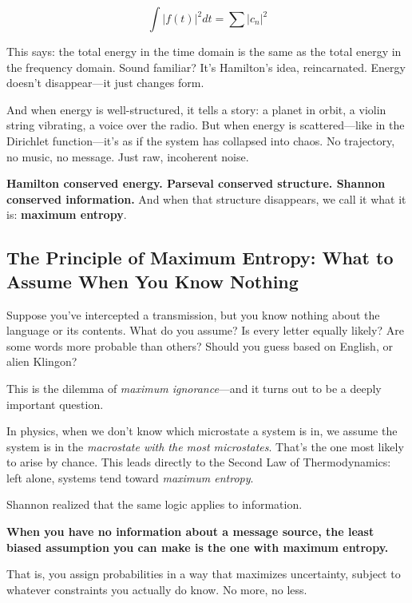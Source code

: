 \begin{tcolorbox}[colback=gray!5!white, colframe=black!80!white, title={Historical Sidebar: From Hamiltonian Mechanics to Energy Spectra}]
  \[
  \int |f(t)|^2 dt = \sum |c_n|^2
  \]
  
  This says: the total energy in the time domain is the same as the total energy in the frequency domain. Sound familiar? It’s Hamilton’s idea, reincarnated. Energy doesn’t disappear—it just changes form.
  
  \bigskip
  
  And when energy is well-structured, it tells a story: a planet in orbit, a violin string vibrating, a voice over the radio. But when energy is scattered—like in the Dirichlet function—it’s as if the system has collapsed into chaos. No trajectory, no music, no message. Just raw, incoherent noise.
  
  \medskip
  
  \textbf{Hamilton conserved energy. Parseval conserved structure. Shannon conserved information.}  
  And when that structure disappears, we call it what it is: \textbf{maximum entropy}.
  
\end{tcolorbox}







\subsection{The Principle of Maximum Entropy: What to Assume When You Know Nothing}

Suppose you’ve intercepted a transmission, but you know nothing about the language or its contents. What do you assume? Is every letter equally likely? Are some words more probable than others? Should you guess based on English, or alien Klingon?

This is the dilemma of \emph{maximum ignorance}—and it turns out to be a deeply important question.

In physics, when we don’t know which microstate a system is in, we assume the system is in the \emph{macrostate with the most microstates}. That’s the one most likely to arise by chance. This leads directly to the Second Law of Thermodynamics: left alone, systems tend toward \emph{maximum entropy}.

Shannon realized that the same logic applies to information.

\textbf{When you have no information about a message source, the least biased assumption you can make is the one with maximum entropy.}

That is, you assign probabilities in a way that maximizes uncertainty, subject to whatever constraints you actually do know. No more, no less.

